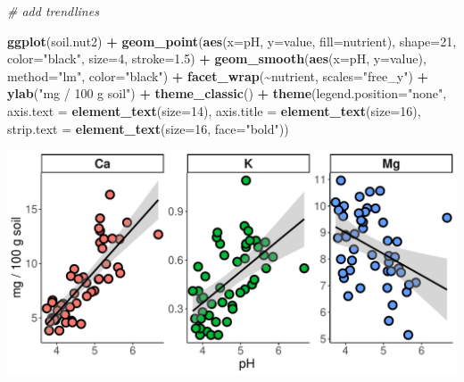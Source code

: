 \documentclass[
]{article}
\newenvironment{Shaded}{\begin{snugshade}}{\end{snugshade}}
\newcommand{\AttributeTok}[1]{\textcolor[rgb]{0.13,0.29,0.53}{#1}}
\newcommand{\CommentTok}[1]{\textcolor[rgb]{0.56,0.35,0.01}{\textit{#1}}}
\newcommand{\DecValTok}[1]{\textcolor[rgb]{0.00,0.00,0.81}{#1}}
\newcommand{\FloatTok}[1]{\textcolor[rgb]{0.00,0.00,0.81}{#1}}
\newcommand{\FunctionTok}[1]{\textcolor[rgb]{0.13,0.29,0.53}{\textbf{#1}}}
\newcommand{\NormalTok}[1]{#1}
\newcommand{\SpecialCharTok}[1]{\textcolor[rgb]{0.81,0.36,0.00}{\textbf{#1}}}
\newcommand{\StringTok}[1]{\textcolor[rgb]{0.31,0.60,0.02}{#1}}
\begin{document}
\begin{Shaded}
\begin{Highlighting}[]
\CommentTok{\# add trendlines}

\FunctionTok{ggplot}\NormalTok{(soil.nut2) }\SpecialCharTok{+}
  \FunctionTok{geom\_point}\NormalTok{(}\FunctionTok{aes}\NormalTok{(}\AttributeTok{x=}\NormalTok{pH, }\AttributeTok{y=}\NormalTok{value, }\AttributeTok{fill=}\NormalTok{nutrient), }
             \AttributeTok{shape=}\DecValTok{21}\NormalTok{, }\AttributeTok{color=}\StringTok{"black"}\NormalTok{, }\AttributeTok{size=}\DecValTok{4}\NormalTok{, }\AttributeTok{stroke=}\FloatTok{1.5}\NormalTok{) }\SpecialCharTok{+}
  \FunctionTok{geom\_smooth}\NormalTok{(}\FunctionTok{aes}\NormalTok{(}\AttributeTok{x=}\NormalTok{pH, }\AttributeTok{y=}\NormalTok{value), }\AttributeTok{method=}\StringTok{"lm"}\NormalTok{, }\AttributeTok{color=}\StringTok{"black"}\NormalTok{) }\SpecialCharTok{+}
  \FunctionTok{facet\_wrap}\NormalTok{(}\SpecialCharTok{\textasciitilde{}}\NormalTok{nutrient, }\AttributeTok{scales=}\StringTok{"free\_y"}\NormalTok{) }\SpecialCharTok{+}
  \FunctionTok{ylab}\NormalTok{(}\StringTok{"mg / 100 g soil"}\NormalTok{) }\SpecialCharTok{+}
  \FunctionTok{theme\_classic}\NormalTok{() }\SpecialCharTok{+}
  \FunctionTok{theme}\NormalTok{(}\AttributeTok{legend.position=}\StringTok{"none"}\NormalTok{,}
        \AttributeTok{axis.text =} \FunctionTok{element\_text}\NormalTok{(}\AttributeTok{size=}\DecValTok{14}\NormalTok{),}
        \AttributeTok{axis.title =} \FunctionTok{element\_text}\NormalTok{(}\AttributeTok{size=}\DecValTok{16}\NormalTok{),}
        \AttributeTok{strip.text =} \FunctionTok{element\_text}\NormalTok{(}\AttributeTok{size=}\DecValTok{16}\NormalTok{, }\AttributeTok{face=}\StringTok{"bold"}\NormalTok{))}
\end{Highlighting}
\end{Shaded}

\includegraphics{module1_3_files/figure-latex/unnamed-chunk-36-1.pdf}
\end{document}
